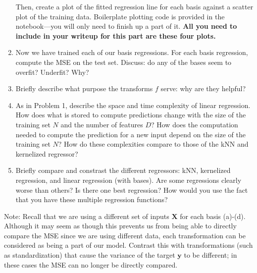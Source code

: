 \documentclass[submit]{harvardml}
\begin{document}
\begin{problem}
\begin{enumerate}
        Then, create a plot of the fitted
        regression line for each basis against a scatter plot
        of the training data. Boilerplate plotting code is provided in the
        notebook---you will only need to finish up a part of it.
        \textbf{All you need to include
          in your writeup for this part are these four plots.}

        \item
          Now we have trained each of our basis regressions. For each basis
          regression, compute the MSE on the test set.  Discuss: do any of the
          bases seem to overfit?  Underfit?  Why?


    \item Briefly describe what purpose the transforms $f$ serve: why are they helpful?

    \item As in Problem 1, describe the space and time complexity of linear regression.  How does what is stored to compute predictions change with the size of the training set $N$ and the number of features $D$?  How does the computation needed to compute the prediction for a new input depend on the size of the training set $N$?  How do these complexities compare to those of the kNN and kernelized regressor?

    \item Briefly compare and constrast the different regressors: kNN,
          kernelized regression, and linear regression (with bases).  Are some
          regressions clearly worse than others?  Is there one best
          regression?  How would you use the fact that you have these multiple
          regression functions?

  \end{enumerate}
  Note:
  Recall that we are using a
  different set of inputs $\mathbf{X}$ for each basis (a)-(d).
  Although it may seem as though this prevents us from being able
  to directly compare the MSE since we are using different data,
  each transformation can be considered as being a part of our model.
  Contrast this with transformations (such as standardization) that cause the variance of the target $\mathbf{y}$ to be different; in these cases the
  MSE can no longer be directly compared.
\end{problem}
\end{document}
